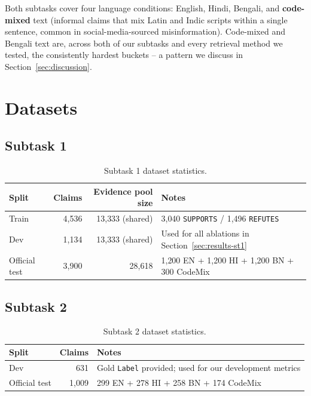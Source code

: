 \documentclass[
]{ceurart}
\begin{document}
Both subtasks cover four language conditions: English, Hindi, Bengali,
and \textbf{code-mixed} text (informal claims that mix Latin and Indic
scripts within a single sentence, common in social-media-sourced
misinformation). Code-mixed and Bengali text are, across both of our
subtasks and every retrieval method we tested, the consistently hardest
buckets -- a pattern we discuss in Section~\ref{sec:discussion}.

\section{Datasets}

\subsection{Subtask 1}

\begin{table}[h]
  \centering
  \caption{Subtask 1 dataset statistics.}
  \label{tab:st1-data}
  \begin{tabular}{@{}lrrl@{}}
    \toprule
    Split & Claims & Evidence pool size & Notes \\
    \midrule
    Train & 4{,}536 & 13{,}333 (shared) & 3{,}040 \texttt{SUPPORTS} / 1{,}496 \texttt{REFUTES} \\
    Dev & 1{,}134 & 13{,}333 (shared) & Used for all ablations in Section~\ref{sec:results-st1} \\
    Official test & 3{,}900 & 28{,}618 & 1{,}200 EN + 1{,}200 HI + 1{,}200 BN + 300 CodeMix \\
    \bottomrule
  \end{tabular}
\end{table}

\subsection{Subtask 2}

\begin{table}[h]
  \centering
  \caption{Subtask 2 dataset statistics.}
  \label{tab:st2-data}
  \begin{tabular}{@{}lrl@{}}
    \toprule
    Split & Claims & Notes \\
    \midrule
    Dev & 631 & Gold \texttt{Label} provided; used for our development metrics \\
    Official test & 1{,}009 & 299 EN + 278 HI + 258 BN + 174 CodeMix \\
    \bottomrule
  \end{tabular}
\end{table}
\end{document}
